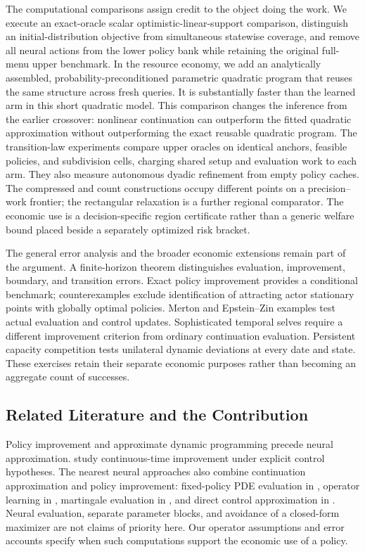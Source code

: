 The computational comparisons assign credit to the object doing the work. We execute an exact-oracle scalar optimistic-linear-support comparison, distinguish an initial-distribution objective from simultaneous statewise coverage, and remove all neural actions from the lower policy bank while retaining the original full-menu upper benchmark. In the resource economy, we add an analytically assembled, probability-preconditioned parametric quadratic program that reuses the same structure across fresh queries. It is substantially faster than the learned arm in this short quadratic model. This comparison changes the inference from the earlier crossover: nonlinear continuation can outperform the fitted quadratic approximation without outperforming the exact reusable quadratic program. The transition-law experiments compare upper oracles on identical anchors, feasible policies, and subdivision cells, charging shared setup and evaluation work to each arm. They also measure autonomous dyadic refinement from empty policy caches. The compressed and count constructions occupy different points on a precision--work frontier; the rectangular relaxation is a further regional comparator. The economic use is a decision-specific region certificate rather than a generic welfare bound placed beside a separately optimized risk bracket.

The general error analysis and the broader economic extensions remain part of the argument. A finite-horizon theorem distinguishes evaluation, improvement, boundary, and transition errors. Exact policy improvement provides a conditional benchmark; counterexamples exclude identification of attracting actor stationary points with globally optimal policies. Merton and Epstein--Zin examples test actual evaluation and control updates. Sophisticated temporal selves require a different improvement criterion from ordinary continuation evaluation. Persistent capacity competition tests unilateral dynamic deviations at every date and state. These exercises retain their separate economic purposes rather than becoming an aggregate count of successes.

\subsection{Related Literature and the Contribution}
Policy improvement and approximate dynamic programming precede neural approximation. \citet{jacka2015} study continuous-time improvement under explicit control hypotheses. The nearest neural approaches also combine continuation approximation and policy improvement: fixed-policy PDE evaluation in \citet{kim2025,kim2026}, operator learning in \citet{lee2024}, martingale evaluation in \citet{cai2025}, and direct control approximation in \citet{han2016}. Neural evaluation, separate parameter blocks, and avoidance of a closed-form maximizer are not claims of priority here. Our operator assumptions and error accounts specify when such computations support the economic use of a policy.

